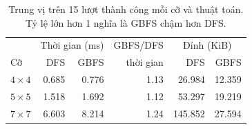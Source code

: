 
\begin{table}[H]\centering\small
\begin{tabular}{@{}lrrrrr@{}}\toprule
 & \multicolumn{2}{c}{Thời gian (ms)} & GBFS/DFS & \multicolumn{2}{c}{Đỉnh (KiB)}\\
Cỡ & DFS & GBFS & thời gian & DFS & GBFS\\\midrule
$4\times4$ & 0.685 & 0.776 & 1.13 & 26.984 & 12.359 \\
$5\times5$ & 1.518 & 1.692 & 1.12 & 53.297 & 19.219 \\
$7\times7$ & 6.603 & 8.214 & 1.24 & 145.852 & 27.594 \\
\bottomrule\end{tabular}
\caption{Trung vị trên 15 lượt thành công mỗi cỡ và thuật toán. Tỷ lệ lớn hơn 1 nghĩa là GBFS chậm hơn DFS.}
\end{table}
